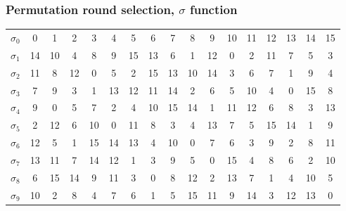 \documentclass{beamer}
\begin{document}
\begin{frame}
\frametitle{Permutation round selection, $\sigma$ function\footnotemark}
  \resizebox{\linewidth}{!} {
          \begin{tabular}{ c| *{16}{c}} \hline
            $\sigma_{0}$ & 0  & 1  & 2  & 3  & 4  & 5  & 6  & 7  & 8  & 9  & 10 & 11 & 12 & 13 & 14 & 15 \\
            $\sigma_{1}$ & 14 & 10 & 4  & 8  & 9  & 15 & 13 & 6  & 1  & 12 & 0  & 2  & 11 & 7  & 5  & 3  \\
            $\sigma_{2}$ & 11 & 8  & 12 & 0  & 5  & 2  & 15 & 13 & 10 & 14 & 3  & 6  & 7  & 1  & 9  & 4  \\
            $\sigma_{3}$ & 7  & 9  & 3  & 1  & 13 & 12 & 11 & 14 & 2  & 6  & 5  & 10 & 4  & 0  & 15 & 8  \\
            $\sigma_{4}$ & 9  & 0  & 5  & 7  & 2  & 4  & 10 & 15 & 14 & 1  & 11 & 12 & 6  & 8  & 3  & 13 \\
            $\sigma_{5}$ & 2  & 12 & 6  & 10 & 0  & 11 & 8  & 3  & 4  & 13 & 7  & 5  & 15 & 14 & 1  & 9  \\
            $\sigma_{6}$ & 12 & 5  & 1  & 15 & 14 & 13 & 4  & 10 & 0  & 7  & 6  & 3  & 9  & 2  & 8  & 11 \\
            $\sigma_{7}$ & 13 & 11 & 7  & 14 & 12 & 1  & 3  & 9  & 5  & 0  & 15 & 4  & 8  & 6  & 2  & 10 \\
            $\sigma_{8}$ & 6  & 15 & 14 & 9  & 11 & 3  & 0  & 8  & 12 & 2  & 13 & 7  & 1  & 4  & 10 & 5  \\
            $\sigma_{9}$ & 10 & 2  & 8  & 4  & 7  & 6  & 1  & 5  & 15 & 11 & 9  & 14 & 3  & 12 & 13 & 0  \\ \hline
          \end{tabular}
  }
\end{frame}
\end{document}
